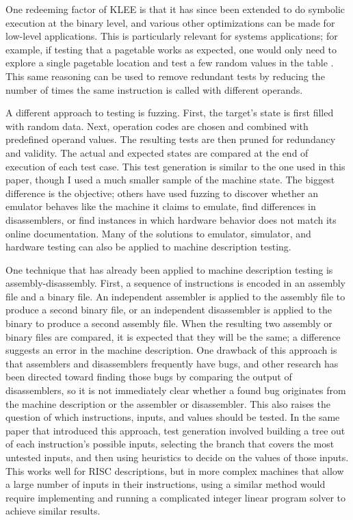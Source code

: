 \documentclass[letterpaper,12pt]{article}
\begin{document}
One redeeming factor of KLEE is that it has since been extended to do symbolic execution at the binary level, and various other optimizations can be made for low-level applications. This is particularly relevant for systems applications; for example, if testing that a pagetable works as expected, one would only need to explore a single pagetable location and test a few random values in the table \cite{Path}. This same reasoning can be used to remove redundant tests by reducing the number of times the same instruction is called with different operands.

A different approach to testing is fuzzing. First, the target's state is first filled with random data. Next, operation codes are chosen and combined with predefined operand values. The resulting tests are then pruned for redundancy and validity. The actual and expected states are compared at the end of execution of each test case\cite{Statecmp}. This test generation is similar to the one used in this paper, though I used a much smaller sample of the machine state. The biggest difference is the objective; others have used fuzzing to discover whether an emulator behaves like the machine it claims to emulate\cite{Emu}, find differences in disassemblers\cite{Nvd}, or find instances in which hardware behavior does not match its online documentation. Many of the solutions to emulator, simulator, and hardware testing can also be applied to machine description testing.

One technique that has already been applied to machine description testing is assembly-disassembly. First, a sequence of instructions is encoded in an assembly file and a binary file. An independent assembler is applied to the assembly file to produce a second binary file, or an independent disassembler is applied to the binary to produce a second assembly file. When the resulting two assembly or binary files are compared, it is expected that they will be the same; a difference suggests an error in the machine description. One drawback of this approach is that assemblers and disassemblers frequently have bugs, and other research has been directed toward finding those bugs by comparing the output of disassemblers\cite{Nvd}, so it is not immediately clear whether a found bug originates from the machine description or the assembler or disassembler. This also raises the question of which instructions, inputs, and values should be tested. In the same paper that introduced this approach, test generation involved building a tree out of each instruction's possible inputs, selecting the branch that covers the most untested inputs, and then using heuristics to decide on the values of those inputs\cite{Checker}. This works well for RISC descriptions, but in more complex machines that allow a large number of inputs in their instructions, using a similar method would require implementing and running a complicated integer linear program solver to achieve similar results.
\end{document}
